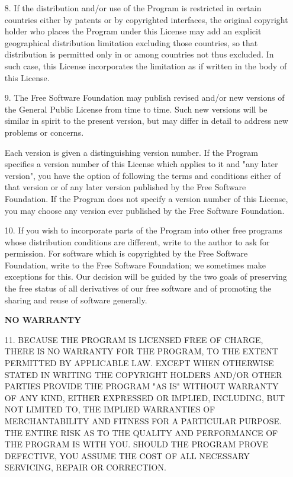 {\begin{itemize}
  This section is intended to make thoroughly clear what is believed
  to be a consequence of the rest of this License.

\item[8.] If the
  distribution and/or use of the Program is restricted in certain
  countries either by patents or by copyrighted interfaces, the
  original copyright holder who places the Program under this License
  may add an explicit geographical distribution limitation excluding
  those countries, so that distribution is permitted only in or among
  countries not thus excluded.  In such case, this License
  incorporates the limitation as if written in the body of this
  License.
  
\item[9.] The Free Software Foundation may publish revised and/or new
  versions of the General Public License from time to time.  Such new
  versions will be similar in spirit to the present version, but may
  differ in detail to address new problems or concerns.
  
  Each version is given a distinguishing version number.  If the
  Program specifies a version number of this License which applies to
  it and "any later version", you have the option of following the
  terms and conditions either of that version or of any later version
  published by the Free Software Foundation.  If the Program does not
  specify a version number of this License, you may choose any version
  ever published by the Free Software Foundation.
  
\item[10.] If you wish to incorporate parts of the Program into other free
  programs whose distribution conditions are different, write to the
  author to ask for permission.  For software which is copyrighted by
  the Free Software Foundation, write to the Free Software Foundation;
  we sometimes make exceptions for this.  Our decision will be guided
  by the two goals of preserving the free status of all derivatives of
  our free software and of promoting the sharing and reuse of software
  generally.
  
\textbf{NO WARRANTY}

\item[11.] BECAUSE THE PROGRAM IS LICENSED FREE OF CHARGE, THERE IS NO
  WARRANTY FOR THE PROGRAM, TO THE EXTENT PERMITTED BY APPLICABLE LAW.
  EXCEPT WHEN OTHERWISE STATED IN WRITING THE COPYRIGHT HOLDERS AND/OR
  OTHER PARTIES PROVIDE THE PROGRAM "AS IS" WITHOUT WARRANTY OF ANY
  KIND, EITHER EXPRESSED OR IMPLIED, INCLUDING, BUT NOT LIMITED TO,
  THE IMPLIED WARRANTIES OF MERCHANTABILITY AND FITNESS FOR A
  PARTICULAR PURPOSE.  THE ENTIRE RISK AS TO THE QUALITY AND
  PERFORMANCE OF THE PROGRAM IS WITH YOU.  SHOULD THE PROGRAM PROVE
  DEFECTIVE, YOU ASSUME THE COST OF ALL NECESSARY SERVICING, REPAIR OR
  CORRECTION.


\end{itemize}}
